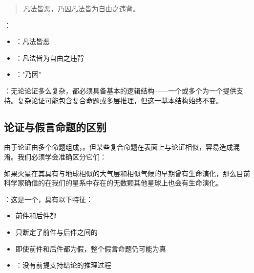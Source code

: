 \begin{examplebox}[title=结论在前的论证（单句形式）]
\begin{quotation}
凡法皆恶，乃因凡法皆为自由之违背。\cite{bentham1802}
\end{quotation}

：
\begin{itemize}
  \item {}：凡法皆恶
  \item {}：凡法皆为自由之违背
  \item {}："乃因"
\end{itemize}
\end{examplebox}

：无论论证多么复杂，都必须具备基本的逻辑结构——一个或多个为一个提供支持。复杂论证可能包含复合命题或多层推理，但这一基本结构始终不变。

\subsection{论证与假言命题的区别}

由于论证由多个命题组成，。但某些复合命题在表面上与论证相似，容易造成混淆。我们必须学会准确区分它们：

\begin{examplebox}[title=假言命题（非论证）]
\begin{displayquote}
如果火星在其具有与地球相似的大气层和相似气候的早期曾有生命演化，那么目前科学家确信的在我们的星系中存在的无数颗其他星球上也会有生命演化。
\end{displayquote}

：这是一个，具有以下特征：
\begin{itemize}
  \item 前件和后件都
  \item 只断定了前件与后件之间的
  \item 即使前件和后件都为假，整个假言命题仍可能为真
  \item {}：没有前提支持结论的推理过程
\end{itemize}
\end{examplebox}

